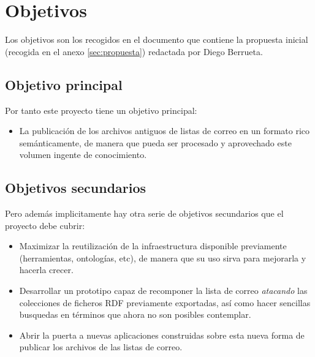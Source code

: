 
\section{Objetivos}

Los objetivos son los recogidos en el documento que contiene la propuesta 
inicial (recogida en el anexo \ref{sec:propuesta}) redactada por Diego 
Berrueta.

\subsection{Objetivo principal}

Por tanto este proyecto tiene un objetivo principal:

\begin{itemize}
  \item La publicación de los archivos antiguos de listas de correo en un 
	formato rico semánticamente, de manera que pueda ser procesado y
	aprovechado este volumen ingente de conocimiento.
\end{itemize}

\subsection{Objetivos secundarios}

Pero además implicitamente hay otra serie de objetivos secundarios que el
proyecto debe cubrir:

\begin{itemize}
  \item Maximizar la reutilización de la infraestructura disponible previamente
	(herramientas, ontologías, etc), de manera que su uso sirva para mejorarla
	y hacerla crecer.
  \item Desarrollar un prototipo capaz de recomponer la lista de correo 
	\emph{atacando} las colecciones de ficheros RDF previamente exportadas,
	así como hacer sencillas busquedas en términos que ahora no son
	posibles contemplar.
  \item Abrir la puerta a nuevas aplicaciones construidas sobre esta nueva forma
	de publicar los archivos de las listas de correo.
\end{itemize}

